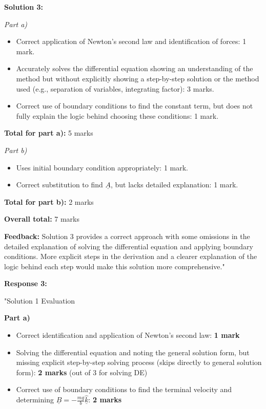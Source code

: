 \documentclass[a4paper,11pt]{article}
\begin{document}
\textbf{Solution 3:}

\textit{Part a)}

\begin{itemize}
    \item Correct application of Newton's second law and identification of forces: 1 mark.
    \item Accurately solves the differential equation showing an understanding of the method but without explicitly showing a step-by-step solution or the method used (e.g., separation of variables, integrating factor): 3 marks.
    \item Correct use of boundary conditions to find the constant term, but does not fully explain the logic behind choosing these conditions: 1 mark.
\end{itemize}

\textbf{Total for part a):} 5 marks

\textit{Part b)}

\begin{itemize}
    \item Uses initial boundary condition appropriately: 1 mark.
    \item Correct substitution to find \( \underline{A} \), but lacks detailed explanation: 1 mark.
\end{itemize}

\textbf{Total for part b):} 2 marks

\textbf{Overall total:} 7 marks

\textbf{Feedback:} Solution 3 provides a correct approach with some omissions in the detailed explanation of solving the differential equation and applying boundary conditions. More explicit steps in the derivation and a clearer explanation of the logic behind each step would make this solution more comprehensive."

\textbf{Response 3:}

"Solution 1 Evaluation

\textbf{Part a)}
\begin{itemize}
    \item Correct identification and application of Newton's second law: \textbf{1 mark}
    \item Solving the differential equation and noting the general solution form, but missing explicit step-by-step solving process (skips directly to general solution form): \textbf{2 marks} (out of 3 for solving DE)
    \item Correct use of boundary conditions to find the terminal velocity and determining \( \underline{B} = - \frac{mg}{b} \hat{\underline{k}} \): \textbf{2 marks}
\end{itemize}
\end{document}
